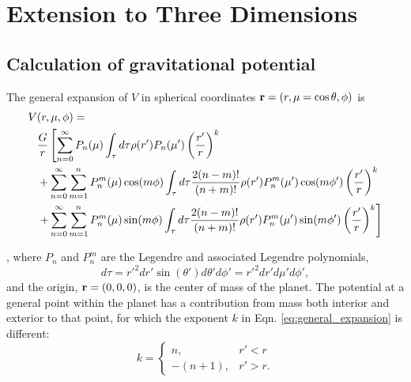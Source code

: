 \section{Extension to Three Dimensions} \label{method_derivation}

\subsection{Calculation of gravitational potential} \label{calc_grav_pot}

The general expansion of $V$ in spherical coordinates ${\bf r} = (r,\mu =
\cos{\theta},\phi)$ is
%
\begin{equation}
    \begin{aligned} V&(r,\mu,\phi) = \\
        &\frac{G}{r} \left[ \sum_{n=0}^{\infty} P_n(\mu) \int_{\tau} d\tau
            \rho(r')P_n(\mu')\left(\frac{r'}{r}\right)^k \right. \\ & +
            \sum_{n=0}^{\infty} \sum_{m=1}^{n} P^m_n(\mu)\cos(m\phi) \int_{\tau} d\tau
            \frac{2(n-m)!}{(n+m)!} \rho(r')P_n^m(\mu')\cos(m\phi')
            \left(\frac{r'}{r}\right)^k \\ & \left.  + \sum_{n=0}^{\infty}
            \sum_{m=1}^{n} P^m_n(\mu)\sin(m\phi) \int_{\tau} d\tau \frac{2(n-m)!}{(n+m)!}
            \rho(r')P_n^m(\mu')\sin(m\phi') \left(\frac{r'}{r}\right)^k \right]
        \end{aligned} \label{eq:general_expansion}
    \end{equation}

\citep{zharkov1978}, where $P_n$ and $P_n^m$ are the Legendre and associated Legendre
polynomials, 
%
\begin{equation*} d\tau = r'^2 dr' \sin(\theta')d\theta' d\phi' = r'^2 dr' d\mu' d\phi',
\end{equation*}
%
and the origin, ${\bf r}=(0,0,0)$, is the center of mass of the planet.  The
potential at a general point within the planet has a contribution from mass both
interior and exterior to that point, for which the exponent $k$ in Eqn.
\eqref{eq:general_expansion} is different:
%
\begin{equation*} k = \begin{cases} n, & r' < r \\ -(n+1), & r' > r .  \end{cases}
\end{equation*}

